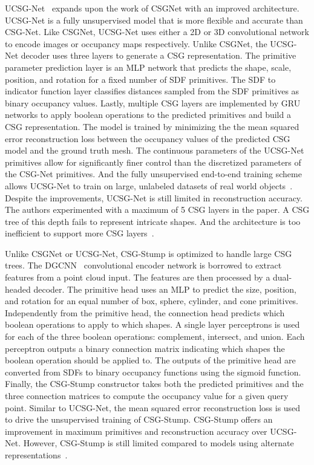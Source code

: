UCSG-Net~\cite{Kania2020} expands upon the work of CSGNet with an improved architecture. UCSG-Net is a fully unsupervised model that is more flexible and accurate than CSG-Net. Like CSGNet, UCSG-Net uses either a 2D or 3D convolutional network to encode images or occupancy maps respectively. Unlike CSGNet, the UCSG-Net decoder uses three layers to generate a CSG representation. The primitive parameter prediction layer is an MLP network that predicts the shape, scale, position, and rotation for a fixed number of SDF primitives. The SDF to indicator function layer classifies distances sampled from the SDF primitives as binary occupancy values. Lastly, multiple CSG layers are implemented by GRU networks to apply boolean operations to the predicted primitives and build a CSG representation. The model is trained by minimizing the the mean squared error reconstruction loss between the occupancy values of the predicted CSG model and the ground truth mesh. The continuous parameters of the UCSG-Net primitives allow for significantly finer control than the discretized parameters of the CSG-Net primitives. And the fully unsupervised end-to-end training scheme allows UCSG-Net to train on large, unlabeled datasets of real world objects~\cite{Kania2020}. Despite the improvements, UCSG-Net is still limited in reconstruction accuracy. The authors experimented with a maximum of 5 CSG layers in the paper. A CSG tree of this depth fails to represent intricate shapes. And the architecture is too inefficient to support more CSG layers~\cite{Ren2021}.

Unlike CSGNet or UCSG-Net, CSG-Stump is optimized to handle large CSG trees. The DGCNN~\cite{Phan2018} convolutional encoder network is borrowed to extract features from a point cloud input. The features are then processed by a dual-headed decoder. The primitive head uses an MLP to predict the size, position, and rotation for an equal number of box, sphere, cylinder, and cone primitives. Independently from the primitive head, the connection head predicts which boolean operations to apply to which shapes. A single layer perceptrons is used for each of the three boolean operations: complement, intersect, and union. Each perceptron outputs a binary connection matrix indicating which shapes the boolean operation should be applied to. The outputs of the primitive head are converted from SDFs to binary occupancy functions using the sigmoid function. Finally, the CSG-Stump constructor takes both the predicted primitives and the three connection matrices to compute the occupancy value for a given query point. Similar to UCSG-Net, the mean squared error reconstruction loss is used to drive the unsupervised training of CSG-Stump. CSG-Stump offers an improvement in maximum primitives and reconstruction accuracy over UCSG-Net. However, CSG-Stump is still limited compared to models using alternate representations~\cite{Phan2018}.

